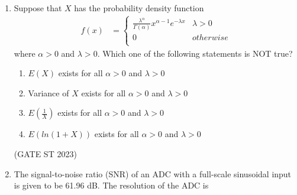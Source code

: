 \begin{enumerate}[label=\thechapter.\arabic*,ref=\thechapter.\theenumi]
\item Suppose that $X$ has the probability density function
\begin{align}
f(x)&=
\begin{cases}
\frac{\lambda^{\alpha}}{\Gamma(\alpha)}x^{\alpha - 1} e^{-\lambda x} & \lambda > 0\\
0 & otherwise\\
\end{cases}
\end{align}
where $\alpha > 0$ and $\lambda > 0$. Which one of the following statements is NOT true?
\begin{enumerate}
\item $E(X)$ exists for all $\alpha > 0 $ and $ \lambda > 0$
\item Variance of $X$ exists for all $\alpha > 0$ and $\lambda > 0$
\item $E(\frac{1}{X})$ exists for all $\alpha > 0$ and $\lambda > 0$
\item $E(ln(1+X))$ exists for all $\alpha > 0$ and $\lambda > 0$
\end{enumerate}
\hfill (GATE ST 2023)\\

\item The signal-to-noise ratio (SNR) of an ADC with a full-scale sinusoidal input is given to be 61.96 dB. The resolution of the ADC is \\
\solution

\end{enumerate}
